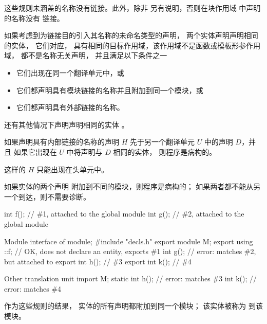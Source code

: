\pnum
{}%
这些规则未涵盖的名称没有链接。此外，除非
另有说明，否则在块作用域 中声明的名称没有
链接。

\pnum
如果考虑到为链接目的引入其名称的未命名类型的声明，
两个实体声明声明相同的实体，
它们对应，
具有相同的目标作用域，该作用域不是函数或模板形参作用域，
都不是名称无关声明，
并且满足以下条件之一
\begin{itemize}
\item
它们出现在同一个翻译单元中，或
\item
它们都声明具有模块链接的名称并且附加到同一个模块，或
\item
它们都声明具有外部链接的名称。
\end{itemize}
\begin{note}
还有其他情况下声明声明相同的实体%
。
\end{note}

\pnum
如果声明具有内部链接的名称的声明 $H$
先于另一个翻译单元 $U$ 中的声明 $D$，并且
如果它出现在 $U$ 中将声明与 $D$ 相同的实体，
则程序是病构的。
\begin{note}
这样的 $H$ 只能出现在头单元中。
\end{note}

\pnum
如果实体的两个声明
附加到不同的模块，则程序是病构的；
如果两者都不能从另一个到达，则不需要诊断。
\begin{example}
\begin{codeblocktu}{}
int f();            // \#1, attached to the global module
int g();            // \#2, attached to the global module
\end{codeblocktu}

\begin{codeblocktu}{Module interface of }
module;
#include "decls.h"
export module M;
export using ::f;   // OK, does not declare an entity, exports \#1
int g();            // error: matches \#2, but attached to 
export int h();     // \#3
export int k();     // \#4
\end{codeblocktu}

\begin{codeblocktu}{Other translation unit}
import M;
static int h();     // error: matches \#3
int k();            // error: matches \#4
\end{codeblocktu}
\end{example}
作为这些规则的结果，
实体的所有声明都附加到同一个模块；
该实体被称为  到该模块。

